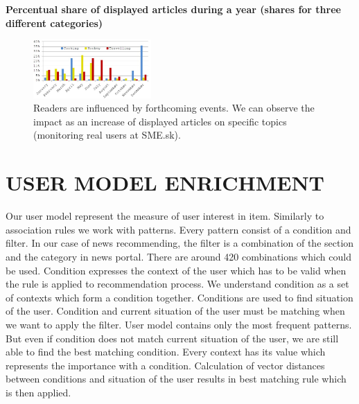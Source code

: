 \documentclass{acm_proc_article-sp}
\begin{document}

\begin{center}

\textbf{Percentual share of displayed articles during a year
(shares for three different categories)}

\end{center}

\begin{figure} [ht]
\centering
\includegraphics[width=0.4\textwidth]{images/graf.png}
\caption{Readers are influenced by forthcoming
events. We can observe the impact as an increase of
displayed articles on specific topics (monitoring real
users at SME.sk).}
\label{graf}
\end{figure}

\section{USER MODEL ENRICHMENT}
Our user model represent the measure of user interest in
item. Similarly to association rules we work with patterns.
Every pattern consist of a condition and filter. In our case
of news recommending, the filter is a combination of the
section and the category in news portal. There are around
420 combinations which could be used.
Condition expresses the context of the user which has to
be valid when the rule is applied to recommendation process.
We understand condition as a set of contexts which form a
condition together. Conditions are used to find situation of
the user. Condition and current situation of the user must
be matching when we want to apply the filter.
User model contains only the most frequent patterns. But
even if condition does not match current situation of the
user, we are still able to find the best matching condition.
Every context has its value which represents the importance
with a condition. Calculation of vector distances between
conditions and situation of the user results in best matching
rule which is then applied.
\end{document}
